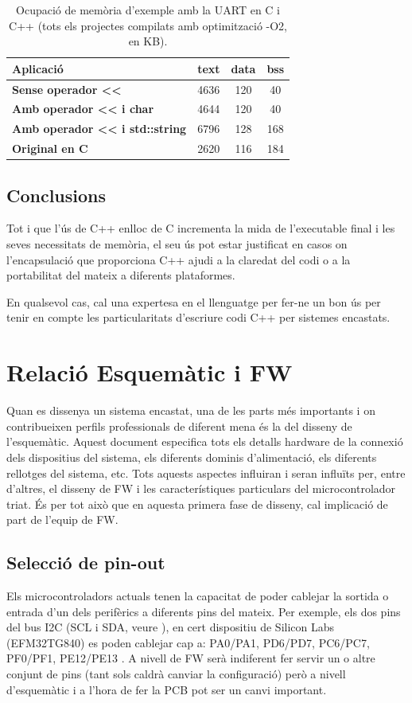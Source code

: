 \begin{table}[!htbp]
\caption{Ocupació de memòria d'exemple amb la UART en C i C++ (tots els projectes compilats amb optimització -O2, en KB).}
\centering
\begin{tabular}{|l|c|c|c|}
\hline
{\bf Aplicació} & {\bf text} & {\bf data} & {\bf bss}\\
\hline
{\bf Sense operador <{}<} & 4636 & 120 & 40 \\
\hline
{\bf Amb operador <{}< i char} & 4644 & 120 & 40 \\
\hline
{\bf Amb operador <{}< i std::string} & 6796 & 128 & 168 \\
\hline
{\bf Original en C} & 2620 & 116 & 184\\
\hline
\end{tabular}
\label{tb:UAR_CXX_size_O2}
\end{table}





\section{Conclusions}
Tot i que l'ús de C++ enlloc de C incrementa la mida de l'executable final i les seves necessitats de memòria, el seu ús pot estar justificat en casos on l'encapsulació que proporciona C++ ajudi a la claredat del codi o a la portabilitat del mateix a diferents plataformes.

En qualsevol cas, cal una expertesa en el llenguatge per fer-ne un bon ús per tenir en compte les particularitats d'escriure codi C++ per sistemes encastats.


\chapter{Relació Esquemàtic i FW}
\label{ch:schematic}
Quan es dissenya un sistema encastat, una de les parts més importants i on contribueixen perfils professionals de diferent mena és la del disseny de l'esquemàtic. Aquest document especifica tots els detalls hardware de la connexió dels dispositius del sistema, els diferents dominis d'alimentació, els diferents rellotges del sistema, etc. Tots aquests aspectes influiran i seran influïts per, entre d'altres, el disseny de \gls{FW} i les característiques particulars del microcontrolador triat. És per tot això que en aquesta primera fase de disseny, cal implicació de part de l'equip de \gls{FW}.

\section{Selecció de pin-out}
Els microcontroladors actuals tenen la capacitat de poder cablejar la sortida o entrada d'un dels perifèrics a diferents pins del mateix. Per exemple, els dos pins del bus I2C (SCL i SDA, veure ), en cert dispositiu de Silicon Labs (EFM32TG840) es poden cablejar cap a: PA0/PA1, PD6/PD7, PC6/PC7, PF0/PF1, PE12/PE13 \cite[50]{EFM32TG840}. A nivell de \gls{FW} serà indiferent fer servir un o altre conjunt de pins (tant sols caldrà canviar la configuració) però a nivell d'esquemàtic i a l'hora de fer la \gls{PCB} pot ser un canvi important.

